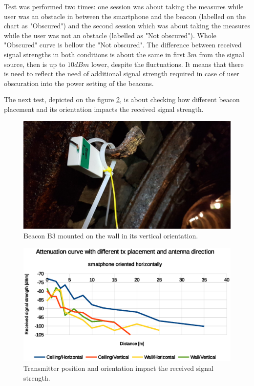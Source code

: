 \documentclass[../main.tex]{subfiles}
\begin{document}
Test was performed two times: one session was about taking the measures while user was an obstacle in between the smartphone and the beacon (labelled on the chart as "Obscured") and the second session which was about taking the measures while the user was not an obstacle (labelled as "Not obscured"). Whole "Obscured" curve is bellow the "Not obscured". The difference between received signal strengths in both conditions is about the same in first $3m$ from the signal source, then is up to $10 dBm$ lower, despite the fluctuations. It means that there is need to reflect the need of additional signal strength required in case of user obscuration into the power setting of the beacons.

The next test, depicted on the figure \ref{fig:tests_case6_tx_placement_and_direction},  is about checking how different beacon placement and its orientation impacts the received signal strength.

\begin{figure}[!htbp]
\includegraphics[width=\textwidth, keepaspectratio]{pictures/beacon_wall_vertical.pdf}
\centering
\caption{Beacon B3 mounted on the wall in its vertical orientation.}
\label{fig:beacon_wall_vertical}
\end{figure}

\begin{figure}[!htbp]
\includegraphics[width=\textwidth, keepaspectratio]{pictures/tests_case6_tx_placement_and_direction}
\centering
\caption{Transmitter position and orientation impact the received signal strength.}
\label{fig:tests_case6_tx_placement_and_direction}
\end{figure}
\end{document}
